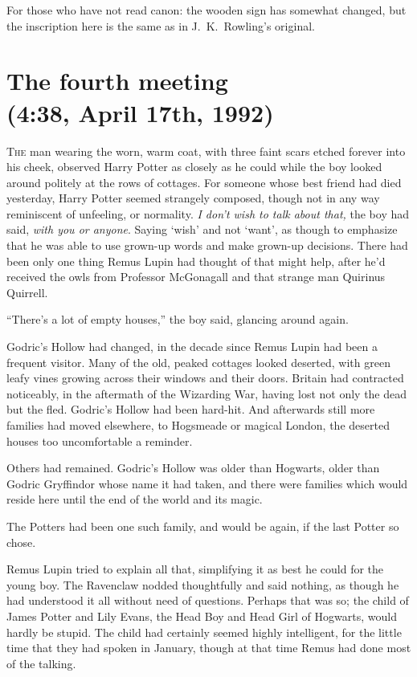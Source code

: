 
\begin{chapterOpeningAuthorNote}
For those who have not read canon: the wooden sign has somewhat changed, but the inscription here is the same as in J.~K.~Rowling’s original.
\end{chapterOpeningAuthorNote}

\section{The fourth meeting\\
(4:38\pm, April 17th, 1992)}

\lettrine{T}{he} man wearing the worn, warm coat, with three faint scars etched forever into his cheek, observed Harry Potter as closely as he could while the boy looked around politely at the rows of cottages. For someone whose best friend had died yesterday, Harry Potter seemed strangely composed, though not in any way reminiscent of unfeeling, or normality. \emph{I don’t wish to talk about that,} the boy had said, \emph{with you or anyone}. Saying ‘wish’ and not ‘want’, as though to emphasize that he was able to use grown-up words and make grown-up decisions. There had been only one thing Remus Lupin had thought of that might help, after he’d received the owls from Professor McGonagall and that strange man Quirinus Quirrell.

“There’s a lot of empty houses,” the boy said, glancing around again.

Godric’s Hollow had changed, in the decade since Remus Lupin had been a frequent visitor. Many of the old, peaked cottages looked deserted, with green leafy vines growing across their windows and their doors. Britain had contracted noticeably, in the aftermath of the Wizarding War, having lost not only the dead but the fled. Godric’s Hollow had been hard-hit. And afterwards still more families had moved elsewhere, to Hogsmeade or magical London, the deserted houses too uncomfortable a reminder.

Others had remained. Godric’s Hollow was older than Hogwarts, older than Godric Gryffindor whose name it had taken, and there were families which would reside here until the end of the world and its magic.

The Potters had been one such family, and would be again, if the last Potter so chose.

Remus Lupin tried to explain all that, simplifying it as best he could for the young boy. The Ravenclaw nodded thoughtfully and said nothing, as though he had understood it all without need of questions. Perhaps that was so; the child of James Potter and Lily Evans, the Head Boy and Head Girl of Hogwarts, would hardly be stupid. The child had certainly seemed highly intelligent, for the little time that they had spoken in January, though at that time Remus had done most of the talking.


